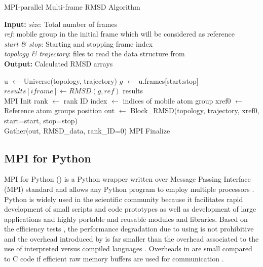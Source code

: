 \begin{algorithm}[ht!]
	\scriptsize
	\caption{MPI-parallel Multi-frame RMSD Algorithm}
	\label{alg:RMSD}
	\hspace*{\algorithmicindent} \textbf{Input:} \emph{size}: Total number of frames \\
	\hspace*{\algorithmicindent} \emph{ref}: mobile group in the initial frame which will be considered as reference \\
	\hspace*{\algorithmicindent} \emph{start \& stop}: Starting and stopping frame index\\
	\hspace*{\algorithmicindent} \emph{topology \& trajectory}: files to read the data structure from \\
	\hspace*{\algorithmicindent} \textbf{Output:} Calculated RMSD arrays
	\begin{algorithmic}[1]
		\State u $\leftarrow$ Universe(topology, trajectory)
		\State $g$ $\leftarrow$ u.frames[start:stop]
		\State $results[iframe] \leftarrow RMSD(g, ref)$
		\EndFor
		\State \Return results
		\EndProcedure
		\\        
		\State MPI Init
		\State rank $\leftarrow$ rank ID
		\State index $\leftarrow$ indices of mobile atom group
		\State xref0 $\leftarrow$ Reference atom group\textsc{}s position
		\State out $\leftarrow$ Block\_RMSD(topology, trajectory, xref0, start=start, stop=stop)
		\\
		\State Gather(out, RMSD\_data, rank\_ID=0)
		\State MPI Finalize
	\end{algorithmic}
\end{algorithm}

\subsection{MPI for Python }
MPI for Python () is a Python wrapper written over Message Passing Interface (MPI) standard and allows any Python program to employ multiple processors \cite{Dalcin:2011aa, Dalcin:2005aa}.
Python is widely used in the scientific community because it facilitates rapid development of small scripts and code prototypes as well as development of large applications and highly portable and reusable modules and libraries.
Based on the efficiency tests \cite{Dalcin:2011aa, Dalcin:2005aa}, the performance degradation due to using  is not prohibitive and the overhead introduced by  is far smaller than the overhead associated to the use of interpreted versus compiled languages \cite{GAiN}.
Overheads in  are small compared to C code if efficient raw memory buffers are used for communication \cite{Dalcin:2011aa}.

